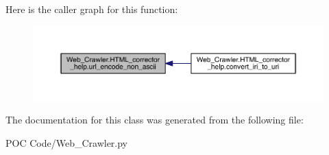 Here is the caller graph for this function\+:
\nopagebreak
\begin{figure}[H]
\begin{center}
\leavevmode
\includegraphics[width=350pt]{class_web___crawler_1_1_h_t_m_l__corrector__help_ad8557b751c09dff4270255c85cfb9b36_icgraph}
\end{center}
\end{figure}




The documentation for this class was generated from the following file\+:\begin{DoxyCompactItemize}
\item 
P\+O\+C Code/Web\+\_\+\+Crawler.\+py\end{DoxyCompactItemize}

